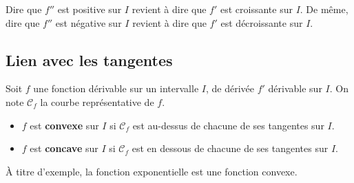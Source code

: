 	\begin{tip}
		Dire que $f''$ est positive sur $I$ revient à dire que $f'$ est croissante sur $I$. De même, dire que $f''$ est négative sur $I$ revient à dire que $f'$ est décroissante sur $I$.
	\end{tip}

	\subsection{Lien avec les tangentes}

	\begin{formula}
		Soit $f$ une fonction dérivable sur un intervalle $I$, de dérivée $f'$ dérivable sur $I$. On note $\mathcal{C}_f$ la courbe représentative de $f$.
		\begin{itemize}
			\item $f$ est \textbf{convexe} sur $I$ si $\mathcal{C}_f$ est au-dessus de chacune de ses tangentes sur $I$.
			\item $f$ est \textbf{concave} sur $I$ si $\mathcal{C}_f$ est en dessous de chacune de ses tangentes sur $I$.
		\end{itemize}
	\end{formula}


	\begin{tip}[Exemple]
		À titre d'exemple, la fonction exponentielle est une fonction convexe.
	\end{tip}

